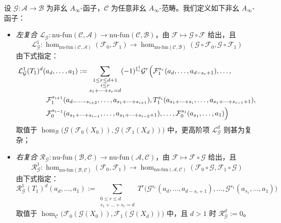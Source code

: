 \begin{Def}\label{def:2.13}
设 $\mathcal G:\mathcal A\to\mathcal B$ 为非幺 $A_\infty$-函子，$\mathcal C$ 为任意非幺
$A_\infty$-范畴。我们定义如下非幺 $A_\infty$-函子：
\begin{itemize}
  \item \emph{左复合} $\mathcal L_{\mathcal G}:\mathrm{nu\text{-}fun}(\mathcal C,
        \mathcal A)\to\mathrm{nu\text{-}fun}(\mathcal C,\mathcal B)$，由
        $\mathcal F\mapsto\mathcal G\circ\mathcal F$ 给出，且
        \[
          \mathcal L^1_{\mathcal G}:\hom_{\mathrm{nu\text{-}fun}(\mathcal C,\mathcal A)}
          (\mathcal F_0,\mathcal F_1)\to\hom_{\mathrm{nu\text{-}fun}(\mathcal C,
          \mathcal B)}(\mathcal G\circ\mathcal F_0,\mathcal G\circ\mathcal F_1)
        \]
        由下式指定：
        \begin{equation}\label{eq:2.19}
          \begin{aligned}
            &\mathcal L^1_{\mathcal G}(T_1)^d(a_d,\dots,a_1)
            :=\sum_{\substack{1\le r\le d+1\\ i\le r\\s_1+\dots+s_r=d}}
            (-1)^{\ddagger^1_i}\mathcal G^r\Bigl(
            \mathcal F_1^{s_r}(a_d,\dots,a_{d-s_r+1}),\dots,\\
            &\qquad\qquad \mathcal F_1^{s_{i+1}}(a_{d-\dots-s_{i+2}},\dots,
            a_{s_1+\dots+s_{i+1}}),T_1^{s_i}(a_{s_1+\dots+s_i},\dots,
            a_{s_1+\dots+s_{i-1}+1}),\\
            &\qquad\qquad \mathcal F_0^{s_{i-1}}(a_{s_1+\dots+s_{i-1}},\dots,
            a_{s_1+\dots+s_{i-2}+1}),\dots,\mathcal F_0^{s_1}(a_{s_1},\dots,a_1)
            \Bigr)
          \end{aligned}
        \end{equation}
        取值于 $\hom_{\mathcal B}\bigl(\mathcal G(\mathcal F_0(X_0)),
        \mathcal G(\mathcal F_1(X_d))\bigr)$ 中，更高阶项 $\mathcal L^d_{\mathcal G}$
        则甚为复杂；
  \item \emph{右复合} $\mathcal R_{\mathcal G}:\mathrm{nu\text{-}fun}(\mathcal B,
        \mathcal C)\to\mathrm{nu\text{-}fun}(\mathcal A,\mathcal C)$，由
        $\mathcal F\mapsto\mathcal F\circ\mathcal G$ 给出，且
        \[
          \mathcal R^1_{\mathcal G}:\hom_{\mathrm{nu\text{-}fun}(\mathcal B,\mathcal C)}
          (\mathcal F_0,\mathcal F_1)\to\hom_{\mathrm{nu\text{-}fun}(\mathcal A,
          \mathcal C)}(\mathcal F_0\circ\mathcal G,\mathcal F_1\circ\mathcal G)
        \]
        由下式指定：
        \begin{equation}\label{eq:2.20}
          \mathcal R^1_{\mathcal G}(T_1)^d(a_d,\dots,a_1)
          :=\sum_{\substack{0\le r\le d\\s_1+\dots+s_r=d}}T^r\bigl(
          \mathcal G^{s_r}(a_d,\dots,a_{d-s_r+1}),\dots,
          \mathcal G^{s_1}(a_{s_1},\dots,a_1)\bigr)
        \end{equation}
        取值于 $\hom_{\mathcal C}\bigl(\mathcal F_0(\mathcal G(X_0)),
        \mathcal F_1(\mathcal G(X_d))\bigr)$ 中，且 $d>1$ 时
        $\mathcal R^d_{\mathcal G}:=0$。
\end{itemize}
\end{Def}
